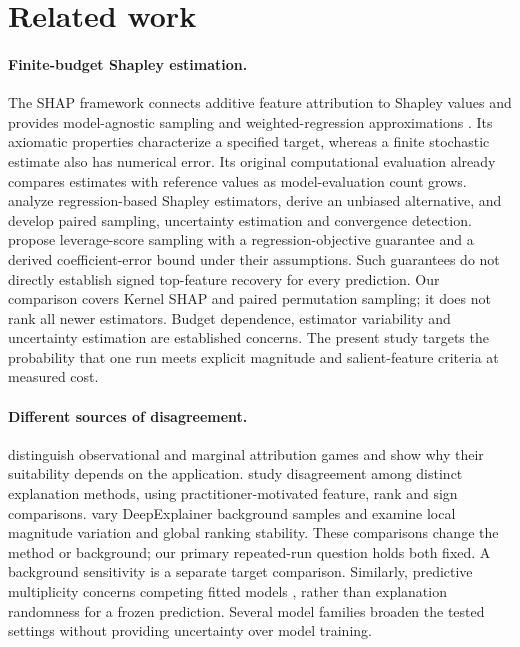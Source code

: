 \section{Related work}
\label{sec:related}

\paragraph{Finite-budget Shapley estimation.}
The SHAP framework connects additive feature attribution to Shapley values and provides model-agnostic sampling and weighted-regression approximations \citep{lundberg2017unified}. Its axiomatic properties characterize a specified target, whereas a finite stochastic estimate also has numerical error. Its original computational evaluation already compares estimates with reference values as model-evaluation count grows. \citet{covert2021improving} analyze regression-based Shapley estimators, derive an unbiased alternative, and develop paired sampling, uncertainty estimation and convergence detection. \citet{musco2025} propose leverage-score sampling with a regression-objective guarantee and a derived coefficient-error bound under their assumptions. Such guarantees do not directly establish signed top-feature recovery for every prediction. Our comparison covers Kernel SHAP and paired permutation sampling; it does not rank all newer estimators. Budget dependence, estimator variability and uncertainty estimation are established concerns. The present study targets the probability that one run meets explicit magnitude and salient-feature criteria at measured cost.

\paragraph{Different sources of disagreement.}
\citet{chen2020true} distinguish observational and marginal attribution games and show why their suitability depends on the application. \citet{krishna2024} study disagreement among distinct explanation methods, using practitioner-motivated feature, rank and sign comparisons. \citet{yuan2023} vary DeepExplainer background samples and examine local magnitude variation and global ranking stability. These comparisons change the method or background; our primary repeated-run question holds both fixed. A background sensitivity is a separate target comparison. Similarly, predictive multiplicity concerns competing fitted models \citep{marx2020}, rather than explanation randomness for a frozen prediction. Several model families broaden the tested settings without providing uncertainty over model training.

